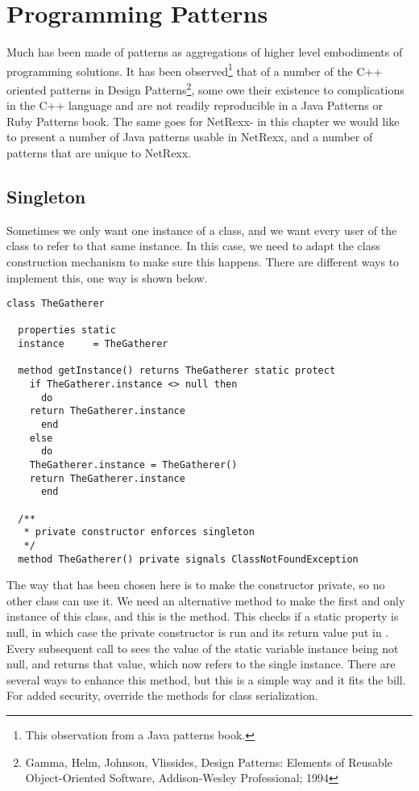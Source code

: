 {\chapter{Programming Patterns}
Much has been made of patterns as aggregations of higher level
embodiments of programming solutions.  It has been
observed\footnote{This observation from a Java patterns book.} that of a
number of the C++ oriented patterns in Design Patterns\footnote{Gamma,
Helm, Johnson, Vlissides, Design
Patterns: Elements of Reusable Object-Oriented Software,
Addison-Wesley Professional; 1994}, some owe their existence
to complications in the C++ language and are not readily reproducible
in a Java Patterns or Ruby Patterns book. The same goes for NetRexx-
in this chapter we would like to present a number of Java patterns
usable in NetRexx, and a number of patterns that are unique to
NetRexx.

\section{Singleton}\label{singleton}
Sometimes we only want one instance of a class, and we want every user
of the class to refer to that same instance. In this case, we need to
adapt the class construction mechanism to make sure this
happens. There are different ways to implement this, one way is shown
below.
\begin{lstlisting}[label=singleton1,caption=Singleton]
class TheGatherer

  properties static
  instance     = TheGatherer

  method getInstance() returns TheGatherer static protect
    if TheGatherer.instance <> null then
      do
	return TheGatherer.instance
      end
    else
      do
	TheGatherer.instance = TheGatherer()
	return TheGatherer.instance
      end
    
  /**
   * private constructor enforces singleton
   */
  method TheGatherer() private signals ClassNotFoundException
\end{lstlisting}
The way that has been chosen here is to make the constructor private,
so no other class can use it. We need an alternative method to make the first
and only instance of this class, and this is the 
method. This checks if a static property  is null, in
which case the private constructor is run and its return value put in
. Every subsequent call to  sees
the value of the static variable instance being not null, and returns
that value, which now refers to the single instance. There are several
ways to enhance this method, but this is a simple way and it fits the
bill. For added security, override the methods for class
serialization.

}
